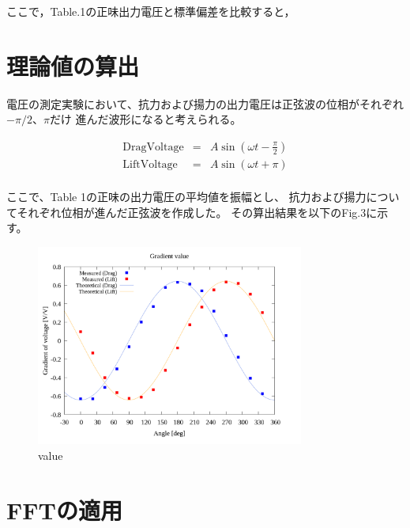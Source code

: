 \documentclass[twocolumn,a4j]{jsarticle}
\begin{document}
ここで，Table.1の正味出力電圧と標準偏差を比較すると，

\newpage

\section{理論値の算出}
電圧の測定実験において、抗力および揚力の出力電圧は正弦波の位相がそれぞれ$-\pi/2$、$\pi$だけ
進んだ波形になると考えられる。

\begin{eqnarray*}
    \mathrm{Drag Voltage} &=& A \sin\left(\omega t - \frac{\pi}{2}\right)\\
    \mathrm{Lift Voltage} &=& A \sin\left(\omega t + \pi\right)\\
\end{eqnarray*}

ここで、Table 1の正味の出力電圧の平均値を振幅とし、
抗力および揚力についてそれぞれ位相が進んだ正弦波を作成した。
その算出結果を以下のFig.3に示す。

\begin{figure}[htbp]
    \footnotesize
    \begin{center}
        \includegraphics[width=88mm]{../images_2/20/20_adjust-value.png}
        \caption{value}
    \end{center}
\end{figure}

\newpage

\section{FFTの適用}
\end{document}
